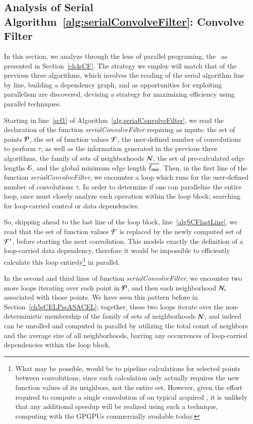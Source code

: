 %
%
\subsection{Analysis of Serial Algorithm~\ref{alg:serialConvolveFilter}: Convolve Filter}
\label{ch5sCFPssASACF}
In this section, we analyze through the lens of parallel programing, the~ as presented in Section~\ref{ch4sCF}. The strategy we employ will match that of the previous three algorithms, which involves the reading of the serial algorithm line by line, building a dependency graph, and as opportunities for exploiting parallelism are discovered, devising a strategy for maximizing efficiency using parallel techniques.

Starting in line~\ref{scf1} of Algorithm~\ref{alg:serialConvolveFilter}, we read the declaration of the function \textit{serialConvolveFilter} requiring as inputs: the set of points $\mathcal{P}$, the set of function values $\mathcal{F}$, the user-defined number of convolutions to perform $\tau$, as well as the information generated in the previous three algorithms, the family of sets of neighborhoods $\mathcal{N}$, the set of pre-calculated edge lengths $\mathcal{E}$, and the global minimum edge length $\overline{\ell_\text{min}}$. Then, in the first line of the function \textit{serialConvolveFilter}, we encounter a loop which runs for the user-defined number of convolutions $\tau$. In order to determine if one can parallelize the entire loop, once must closely analyze each operation within the loop block; searching for loop-carried control or data dependencies.

So, skipping ahead to the last line of the loop block, line~\ref{algSCFlastLine}, we read that the set of function values $\mathcal{F}$ is replaced by the newly computed set of  $\mathcal{F}'$, before starting the next convolution. This models exactly the definition of a loop-carried data dependency, therefore it would be impossible to efficiently calculate this loop entirely\footnote{What may be possible, would be to pipeline calculations for selected points between convolutions, since each calculation only actually requires the new function values of its neighbors, not the entire set. However, given the effort required to compute a single convolution of  on typical acquired \tdd{}, it is unlikely that any additional speedup will be realized using such a technique, computing with the GPGPUs commercially available today.} in parallel.

In the second and third lines of function \textit{serialConvolveFilter}, we encounter two more loops iterating over each point in $\mathcal{P}$, and then each neighborhood $\mathcal{N}_v$ associated with those points. We have seen this pattern before in Section~\ref{ch5sCELPssASACEL}; together, these two loops iterate over the non-deterministic membership of the family of sets of neighborhoods $\mathcal{N}$, and indeed can be unrolled and computed in parallel by utilizing the total count of neighbors and the average size of all neighborhoods, barring any occurrences of loop-carried dependencies within the loop block.

